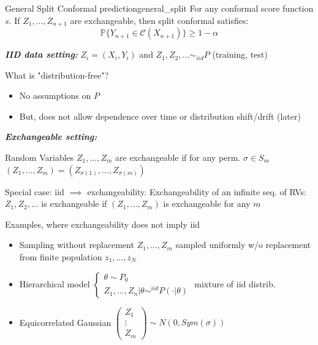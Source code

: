 \begin{thm}{General Split Conformal prediction}{general_split}
For any conformal score function $s$. If $Z_1, \dots, Z_{n+1}$ are exchangeable, then split conformal satisfies:
\[
\mathbb{P}\{Y_{n+1} \in \mathcal{C}(X_{n+1})\} \geq 1 - \alpha
\]
\end{thm}

\emph{\textbf{IID data setting:}}
$Z_{i} = (X_{i}, Y_{i})$ and $Z_{1}, Z_{2}, \dots \sim_{iid} P$ (training, test)

What is "distribution-free"?
\begin{itemize}
    \item No assumptions on $P$
    \item But, does not allow dependence over time or distribution shift/drift (later)
\end{itemize}


\emph{\textbf{Exchangeable setting:}}

\begin{defn}[Exchangeable]
    Random Variables $Z_{1}, \dots, Z_{m}$ are exchangeable if for any perm. $\sigma \in S_{m}$
$(Z_{1}, \dots, Z_{m}) = (Z_{\sigma(1)}, \dots, Z_{\sigma(m)})$
\end{defn}

Special case: iid $\implies$ exchangeability. Exchangeability of an infinite seq. of RVs:
$Z_{1}, Z_{2}, \dots$ is exchangeable if $(Z_1,
\dots,Z_m)$ is exchangeable for any $m$

Examples, where exchangeability does not imply iid
\begin{itemize}
    \item[1.] Sampling without replacement
   $Z_{1}, \dots, Z_{m}$ sampled uniformly w/o replacement from finite population $z_{1}, \dots, z_{N}$
    \item[2.] Hierarchical model
   $\begin{cases} \theta \sim P_{0} \\ Z_{1}, \dots, Z_{n} | \theta \sim^{iid} P(\cdot | \theta) \end{cases}$
   mixture of iid distrib.

    \item[3.] Equicorrelated Gaussian
   $\begin{pmatrix} Z_{1} \\ \vdots \\ Z_{m} \end{pmatrix} \sim N(0, Sym(\sigma))$
\end{itemize}

